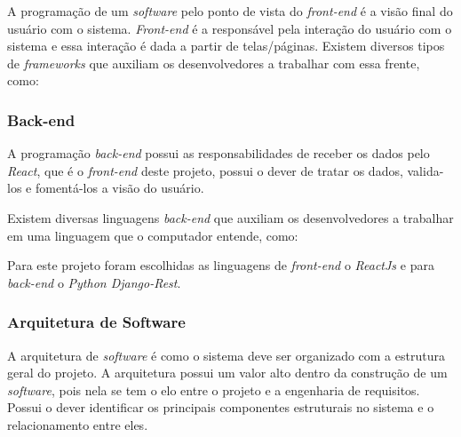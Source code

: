 A programação de um \textit{software} pelo ponto de vista do \textit{front-end} é a visão final do usuário com o sistema. \textit{Front-end} é a responsável pela interação do usuário com o sistema e essa interação é dada a partir de telas/páginas. Existem diversos tipos de \textit{frameworks} que auxiliam os desenvolvedores a trabalhar com essa frente, como:


\subsubsection{Back-end}
\label{sec:back-end}

A programação \textit{back-end} possui as responsabilidades de receber os dados pelo \textit{React}, que é o \textit{front-end} deste projeto, possui o dever de tratar os dados, valida-los e fomentá-los a visão do usuário.

Existem diversas linguagens \textit{back-end} que auxiliam os desenvolvedores a trabalhar em uma linguagem que o computador entende, como:


Para este projeto foram escolhidas as linguagens de \textit{front-end} o \textit{ReactJs} e para \textit{back-end} o \textit{Python Django-Rest}.

\subsubsection{Arquitetura de Software}

A arquitetura de \textit{software} é como o sistema deve ser organizado com a estrutura geral do projeto. A arquitetura possui um valor alto dentro da construção de um \textit{software}, pois nela se tem o elo entre o projeto e a engenharia de requisitos. Possui o dever identificar os principais componentes estruturais no sistema e o relacionamento entre eles.

